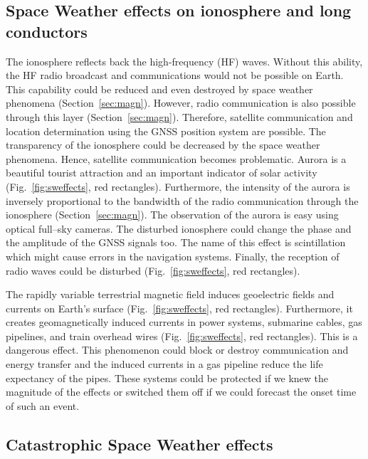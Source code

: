 \documentclass[sn-aps]{sn-jnl}%
\begin{document}
\subsection{Space Weather effects on ionosphere and long conductors}
\label{sec:swgeneral}

The ionosphere reflects back the high-frequency (HF) waves. Without this ability, the HF radio broadcast and communications would not be possible on Earth. This capability could be reduced and even destroyed by space weather phenomena (Section~\ref{sec:magn}). However, radio communication is also possible through this layer (Section~\ref{sec:magn}). Therefore, satellite communication and location determination using the GNSS position system are possible. The transparency of the ionosphere could be decreased by the space weather phenomena. Hence, satellite communication becomes problematic. Aurora is a beautiful tourist attraction and an important indicator of solar activity (Fig.~\ref{fig:sweffects}, red rectangles). Furthermore, the intensity of the aurora is inversely proportional to the bandwidth of the radio communication through the ionosphere (Section~\ref{sec:magn}). The observation of the aurora is easy using optical full--sky cameras. The disturbed ionosphere could change the phase and the amplitude of the GNSS signals too. The name of this effect is scintillation which might cause errors in the navigation systems. Finally, the reception of radio waves could be disturbed (Fig.~\ref{fig:sweffects}, red rectangles). 

The rapidly variable terrestrial magnetic field induces geoelectric fields and currents on Earth's surface (Fig.~\ref{fig:sweffects}, red rectangles). Furthermore, it creates geomagnetically induced currents in power systems, submarine cables, gas pipelines, and train overhead wires (Fig.~\ref{fig:sweffects}, red rectangles). This is a dangerous effect. This phenomenon could block or destroy communication and energy transfer and the induced currents in a gas pipeline reduce the life expectancy of the pipes. These systems could be protected if we knew the magnitude of the effects or switched them off if we could forecast the onset time of such an event. 

\subsection{Catastrophic Space Weather effects}
\label{sec:swcata}
\end{document}
